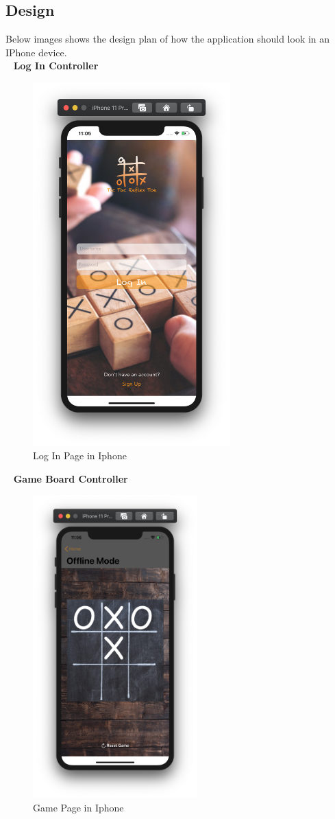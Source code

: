 \documentclass{article}
\begin{document}
    \subsection{Design}
        Below images shows the design plan of how the application should look in an IPhone device.\\
        ~\newline
        \textbf{Log In Controller}
        \begin{figure}[h]
        \centering
        \includegraphics[width=3in]{images/login.png}
        \caption{Log In Page in Iphone}
        \end{figure}
        ~\newpage
        \textbf{Game Board Controller}
        \begin{figure}[h]
        \centering
        \includegraphics[width=2.5in]{images/board.png}
        \caption{Game Page in Iphone}
        \end{figure}
        
\end{document}
